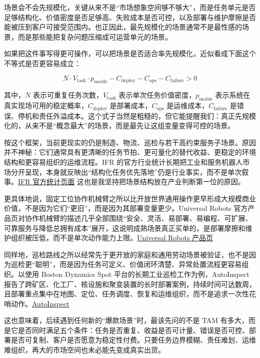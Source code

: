 场景会不会先规模化，关键从来不是“市场想象空间够不够大”，而是任务单元是否足够结构化、价值密度是否足够高、失败成本是否可控，以及部署与维护摩擦是否能被压到客户可接受范围内。也正因此，最先规模化的场景通常不是最性感的场景，而是那些能把复杂问题压缩成可运营单元的场景。

如果把这件事写得更可操作，可以把场景是否适合率先规模化，近似看成下面这个不等式是否更容易成立：

\begingroup
\scriptsize
\begin{equation*}
N \cdot V_{\text{task}} \cdot p_{\text{usable}} - C_{\text{deploy}} - C_{\text{ops}} - C_{\text{failure}} > 0
\end{equation*}
\endgroup

其中，\(N\) 表示可重复任务次数，\(V_{\text{task}}\) 表示单次任务价值密度，\(p_{\text{usable}}\) 表示系统在真实现场可用的稳定概率，\(C_{\text{deploy}}\) 是部署成本，\(C_{\text{ops}}\) 是运维成本，\(C_{\text{failure}}\) 是错误、停机和责任外溢成本。这个式子当然是粗糙的，但它能提醒我们：真正先规模化的，从来不是“概念最大”的场景，而是最先让这组变量变得可控的场景。

按这个框架，当前更现实的仍是制造、物流、巡检与若干高约束服务子场景。原因并不神秘：它们通常具有更清晰的任务节拍、更可量化的替代收益、更稳定的环境结构和更容易组织的运维流程。IFR 的官方行业统计长期把工业和服务机器人市场分开呈现，本身就反映出“结构化任务优先落地”仍是行业事实，而不是单次叙事。\href{https://ifr.org/worldrobotics/}{IFR 官方统计页面} 这也是我坚持把场景结构放在产业判断第一位的原因。

更具体地说，固定工位协作机械臂之所以比开放世界通用操作更早形成大规模商业价值，不是因为它们“更旧”，而是因为其部署变量更少。Universal Robots 官方产品页对协作机械臂的描述几乎全部围绕“安全、灵活、易部署、易编程、可扩展、可靠服务与降低总拥有成本”展开，这说明成熟场景真正买单的，是部署摩擦和维护组织被压低，而不是单次动作能力上限。\href{https://www.universal-robots.com/products/}{Universal Robots 产品页}

同样地，巡检路线之所以经常先于更开放的家庭和通用劳动场景被验证，也不是因为巡检更“聪明”，而是因为任务可定义、价值闭环清楚、异常处置流程更容易组织。以使用 Boston Dynamics Spot 平台的长期工业巡检工作为例，AutoInspect 报告了跨矿区、化工厂、核设施和聚变装置的长时部署案例，持续时间可达数周，且部署重点集中在地图、定位、任务调度、恢复和运维组织，而不是追求一次性花哨动作。\href{https://arxiv.org/abs/2404.12785}{AutoInspect}

这也意味着，后续遇到任何新的“爆款场景”时，最该先问的不是 TAM 有多大，而是它是否同时满足五个条件：任务是否重复、收益是否可计量、错误是否可控、部署是否可复制、客户是否愿意为稳定性付费。只要任务边界模糊、责任难划、运维难组织，再大的市场空间也未必能先变成真实出货。


